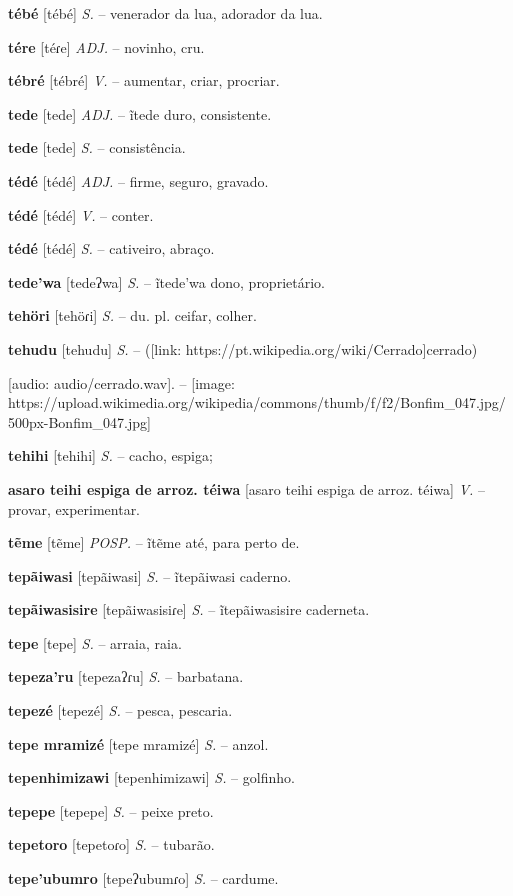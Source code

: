 {{{{\textbf{tébé} [tébé] \textit{S.} -- venerador da lua, adorador da lua.

\textbf{tére} [téɾe] \textit{ADJ.} -- novinho, cru.

\textbf{tébré} [tébré] \textit{V.} -- aumentar, criar, procriar.

\textbf{tede} [tede] \textit{ADJ.} -- ĩtede duro, consistente.

\textbf{tede} [tede] \textit{S.} -- consistência.

\textbf{tédé} [tédé] \textit{ADJ.} -- firme, seguro, gravado.

\textbf{tédé} [tédé] \textit{V.} -- conter.

\textbf{tédé} [tédé] \textit{S.} -- cativeiro, abraço.

\textbf{tede'wa} [tedeʔwa] \textit{S.} -- ĩtede'wa dono, proprietário.

\textbf{tehöri} [tehöɾi] \textit{S.} -- du. pl. ceifar, colher.

\textbf{tehudu} [tehudu] \textit{S.} -- ([link: https://pt.wikipedia.org/wiki/Cerrado]cerrado)} [audio: audio/cerrado.wav]{\faHeadphones}. -- [image: https://upload.wikimedia.org/wikipedia/commons/thumb/f/f2/Bonfim_047.jpg/500px-Bonfim_047.jpg]

\textbf{tehihi} [tehihi] \textit{S.} -- cacho, espiga;

\textbf{asaro teihi espiga de arroz. téiwa} [asaro teihi espiga de arroz. téiwa] \textit{V.} -- provar, experimentar.

\textbf{tẽme} [tẽme] \textit{POSP.} -- ĩtẽme até, para perto de.

\textbf{tepãiwasi} [tepãiwasi] \textit{S.} -- ĩtepãiwasi caderno.

\textbf{tepãiwasisire} [tepãiwasisiɾe] \textit{S.} -- ĩtepãiwasisire caderneta.

\textbf{tepe} [tepe] \textit{S.} -- arraia, raia.

\textbf{tepeza'ru} [tepezaʔɾu] \textit{S.} -- barbatana.

\textbf{tepezé} [tepezé] \textit{S.} -- pesca, pescaria.

\textbf{tepe mramizé} [tepe mramizé] \textit{S.} -- anzol.

\textbf{tepenhimizawi} [tepenhimizawi] \textit{S.} -- golfinho.

\textbf{tepepe} [tepepe] \textit{S.} -- peixe preto.

\textbf{tepetoro} [tepetoɾo] \textit{S.} -- tubarão.

\textbf{tepe'ubumro} [tepeʔubumɾo] \textit{S.} -- cardume.

}}}
